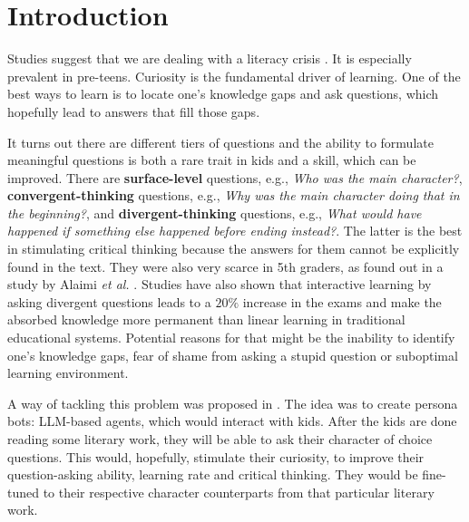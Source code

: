 \documentclass[fleqn,moreauthors,10pt]{ds_report}
\affiliation{\textit{Advisors: Slavko Žitnik}}
\begin{document}
\flushbottom 

\maketitle 
 
\thispagestyle{empty}


\section*{Introduction}

Studies suggest that we are dealing with a literacy crisis \cite{nielen_digital_2018}.
It is especially prevalent in pre-teens. Curiosity is the fundamental driver of learning.
One of the best ways to learn is to locate one's knowledge gaps and ask questions, which
hopefully lead to answers that fill those gaps.

It turns out there are different tiers of questions and the ability to
formulate meaningful questions is both a rare trait in kids and a skill,
which can be improved. There are \textbf{surface-level} questions, e.g., 
\emph{Who was the main character?}, \textbf{conver\-gent-thinking}
questions, e.g., \emph{Why was the main character doing that in the
beginning?}, and \textbf{divergent-thinking} questions, e.g., \emph{What
would have happened if something else happened before ending instead?}.
The latter is the best in stimulating critical thinking because the
answers for them cannot be explicitly found in the text. They were also
very scarce in 5th graders, as found out in a study by Alaimi
\emph{et al.} \cite{alaimi_pedagogical_2020}. Studies have also shown that
interactive learning by asking divergent questions leads to a $20\%$ 
increase in the exams and make the absorbed knowledge more permanent
than linear learning in traditional educational systems. Potential reasons 
for that might be the inability to identify one's knowledge gaps,
fear of shame from asking a stupid question or suboptimal learning
environment.

A way of tackling this problem was proposed in \cite{alaimi_pedagogical_2020}. The idea
was to create persona bots: LLM-based agents, which would interact with kids. After the
kids are done reading some literary work, they will be able to ask their character of
choice questions. This would, hopefully, stimulate their curiosity, to improve their
question-asking ability, learning rate and critical thinking. They would be fine-tuned
to their respective character counterparts from that particular literary work. 
\end{document}
